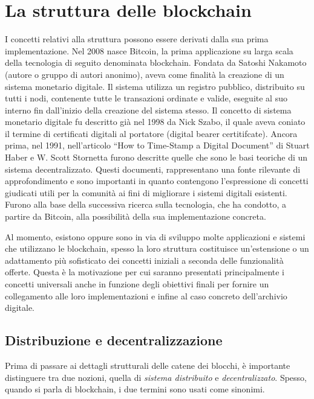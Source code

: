 \section{La struttura delle blockchain}

I concetti relativi alla struttura possono essere derivati dalla sua prima implementazione. Nel 2008 nasce Bitcoin, la prima applicazione su larga scala della tecnologia di seguito denominata blockchain. Fondata da Satoshi Nakamoto (autore o gruppo di autori anonimo), aveva come finalità la creazione di un sistema monetario digitale. Il sistema utilizza un registro pubblico, distribuito su tutti i nodi, contenente tutte le transazioni ordinate e valide, eseguite al suo interno fin dall’inizio della creazione del sistema stesso. Il concetto di sistema monetario digitale fu descritto già nel 1998 da Nick Szabo, il quale aveva coniato il termine di certificati digitali al portatore (digital bearer certitifcate). Ancora prima, nel 1991, nell’articolo “How to Time-Stamp a Digital Document” di Stuart Haber e W. Scott Stornetta furono descritte quelle che sono le basi teoriche di un sistema decentralizzato. Questi documenti, rappresentano una fonte rilevante di approfondimento e sono importanti in quanto contengono l’espressione di concetti giudicati utili per la comunità ai fini di migliorare i sistemi digitali esistenti. Furono alla base della successiva ricerca sulla tecnologia, che ha condotto, a partire da Bitcoin, alla possibilità della sua implementazione concreta.

Al momento, esistono oppure sono in via di sviluppo molte applicazioni e sistemi che utilizzano le blockchain, spesso la loro struttura costituisce un’estensione o un adattamento più sofisticato dei concetti iniziali a seconda delle funzionalità offerte. Questa è la motivazione per cui saranno presentati principalmente i concetti universali anche in funzione degli obiettivi finali per fornire un collegamento alle loro implementazioni e infine al caso concreto dell’archivio digitale.


\subsection{Distribuzione e decentralizzazione}

Prima di passare ai dettagli strutturali delle catene dei blocchi, è importante distinguere tra due nozioni, quella di \emph{sistema distribuito} e \emph{decentralizzato}. Spesso, quando si parla di blockchain, i due termini sono usati come sinonimi. 

